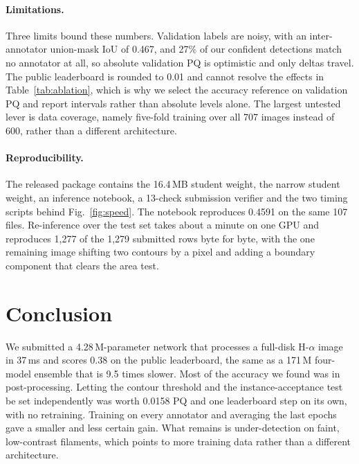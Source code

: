 \documentclass[sigconf]{acmart}
\begin{document}
\paragraph{Limitations.}
Three limits bound these numbers. Validation labels are noisy, with an
inter-annotator union-mask IoU of 0.467, and 27\% of our confident detections
match no annotator at all, so absolute validation PQ is optimistic and only
deltas travel. The public leaderboard is rounded to 0.01 and cannot resolve the
effects in Table~\ref{tab:ablation}, which is why we select the accuracy
reference on validation PQ and report intervals rather than absolute levels
alone. The largest untested lever is data coverage, namely five-fold training
over all 707 images instead of 600, rather than a different architecture.

\paragraph{Reproducibility.}
The released package contains the 16.4\,MB student weight, the narrow student
weight, an inference notebook, a 13-check submission verifier and the two timing
scripts behind Fig.~\ref{fig:speed}. The notebook reproduces 0.4591 on the same
107 files. Re-inference over the test set takes about a minute on one GPU and
reproduces 1{,}277 of the 1{,}279 submitted rows byte for byte, with the one
remaining image shifting two contours by a pixel and adding a boundary component
that clears the area test.

\section{Conclusion}
    We submitted a 4.28\,M-parameter network that processes a full-disk
    H-$\alpha$ image in 37\,ms and scores 0.38 on the public leaderboard, the
    same as a 171\,M four-model ensemble that is 9.5 times slower. Most of the
    accuracy we found was in post-processing. Letting the contour threshold and
    the instance-acceptance test be set independently was worth 0.0158 PQ and one
    leaderboard step on its own, with no retraining. Training on every annotator
    and averaging the last epochs gave a smaller and less certain gain. What
    remains is under-detection on faint, low-contrast filaments, which points to
    more training data rather than a different architecture.
\end{document}
